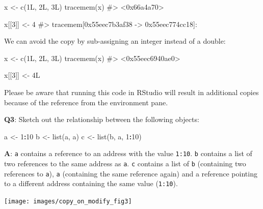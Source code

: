 \documentclass[
]{krantz}
\makeatletter
\newenvironment{Shaded}{\begin{snugshade}}{\end{snugshade}}
\newcommand{\CommentTok}[1]{\textcolor[rgb]{0.56,0.35,0.01}{\textit{#1}}}
\newcommand{\DecValTok}[1]{\textcolor[rgb]{0.00,0.00,0.81}{#1}}
\newcommand{\KeywordTok}[1]{\textcolor[rgb]{0.13,0.29,0.53}{\textbf{#1}}}
\newcommand{\NormalTok}[1]{#1}
\newcommand{\OperatorTok}[1]{\textcolor[rgb]{0.81,0.36,0.00}{\textbf{#1}}}
\newcommand{\StringTok}[1]{\textcolor[rgb]{0.31,0.60,0.02}{#1}}
\newenvironment{kframe}{%
\medskip{}
\setlength{\fboxsep}{.8em}
 \def\at@end@of@kframe{}%
 \ifinner\ifhmode%
  \def\at@end@of@kframe{\end{minipage}}%
  \begin{minipage}{\columnwidth}%
 \fi\fi%
 \def\FrameCommand##1{\hskip\@totalleftmargin \hskip-\fboxsep
 \colorbox{shadecolor}{##1}\hskip-\fboxsep
     \hskip-\linewidth \hskip-\@totalleftmargin \hskip\columnwidth}%
 \MakeFramed {\advance\hsize-\width
   \@totalleftmargin\z@ \linewidth\hsize
   \@setminipage}}%
 {\par\unskip\endMakeFramed%
 \at@end@of@kframe}
\renewenvironment{Shaded}{\begin{kframe}}{\end{kframe}}
\renewcommand{\KeywordTok} [1]{\textcolor[rgb]{0.00,0.44,0.13}{{#1}}}
\renewcommand{\DecValTok}  [1]{\textcolor[rgb]{0.25,0.63,0.44}{{#1}}}
\renewcommand{\StringTok}  [1]{\textcolor[rgb]{0.25,0.44,0.63}{{#1}}}
\renewcommand{\CommentTok} [1]{\textcolor[rgb]{0.38,0.63,0.69}{{#1}}}
\renewcommand{\NormalTok}  [1]{{#1}}
\makeatother
\begin{document}
\begin{Shaded}
\begin{Highlighting}[]
\NormalTok{x <-}\StringTok{ }\KeywordTok{c}\NormalTok{(1L, 2L, 3L)}
\KeywordTok{tracemem}\NormalTok{(x)}
\CommentTok{#> <0x66a4a70>}

\NormalTok{x[[}\DecValTok{3}\NormalTok{]] <-}\StringTok{ }\DecValTok{4}
\CommentTok{#> tracemem[0x55eec7b3af38 -> 0x55eec774cc18]: }
\end{Highlighting}
\end{Shaded}

We can avoid the copy by sub-assigning an integer instead of a double:

\begin{Shaded}
\begin{Highlighting}[]
\NormalTok{x <-}\StringTok{ }\KeywordTok{c}\NormalTok{(1L, 2L, 3L)}
\KeywordTok{tracemem}\NormalTok{(x)}
\CommentTok{#> <0x55eec6940ae0>}

\NormalTok{x[[}\DecValTok{3}\NormalTok{]] <-}\StringTok{ }\NormalTok{4L}
\end{Highlighting}
\end{Shaded}

Please be aware that running this code in RStudio will result in additional copies because of the reference from the environment pane.

\textbf{{Q3}}: Sketch out the relationship between the following objects:

\begin{Shaded}
\begin{Highlighting}[]
\NormalTok{a <-}\StringTok{ }\DecValTok{1}\OperatorTok{:}\DecValTok{10}
\NormalTok{b <-}\StringTok{ }\KeywordTok{list}\NormalTok{(a, a)}
\NormalTok{c <-}\StringTok{ }\KeywordTok{list}\NormalTok{(b, a, }\DecValTok{1}\OperatorTok{:}\DecValTok{10}\NormalTok{)}
\end{Highlighting}
\end{Shaded}

\textbf{{A}}: \texttt{a} contains a reference to an address with the value \texttt{1:10}. \texttt{b} contains a list of two references to the same address as \texttt{a}. \texttt{c} contains a list of \texttt{b} (containing two references to \texttt{a}), \texttt{a} (containing the same reference again) and a reference pointing to a different address containing the same value (\texttt{1:10}).

\begin{center}\texttt{[image: images/copy\_on\_modify\_fig3]} \end{center}
\end{document}
